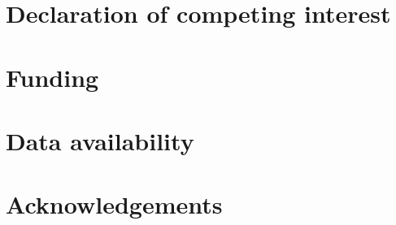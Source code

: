 \documentclass[preprint,12pt,authoryear]{elsarticle}
\begin{document}
\section*{Declaration of competing interest}

\section*{Funding}

\section*{Data availability}


\section*{Acknowledgements}



\end{document}
